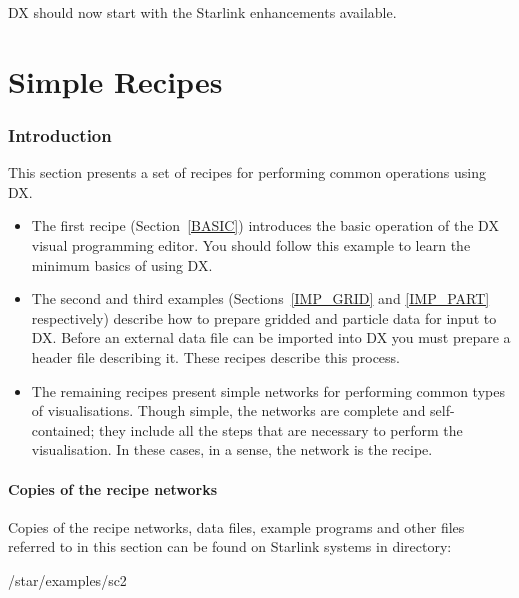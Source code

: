 \documentclass[twoside,11pt]{starlink}
\begin{document}
DX should now start with the Starlink enhancements available.


\cleardoublepage

\part{Simple Recipes}

\section{Introduction}

This section presents a set of recipes for performing common operations
using DX.

\begin{itemize}

  \item The first recipe (Section~\ref{BASIC}) introduces the basic
   operation of the DX visual programming editor. You should follow this
   example to learn the minimum basics of using DX.

  \item The second and third examples (Sections~\ref{IMP_GRID} and
   \ref{IMP_PART} respectively) describe how to prepare gridded and
   particle data for input to DX. Before an external data file can be
   imported into DX you must prepare a header file describing it. These
   recipes describe this process.

  \item The remaining recipes present simple networks for performing
   common types of visualisations. Though simple, the networks are
   complete and self-contained; they include all the steps that are
   necessary to perform the visualisation. In these cases, in a sense,
   the network is the recipe.

\end{itemize}

\subsection{Copies of the recipe networks}

Copies of the recipe networks, data files, example programs and other
files referred to in this section can be found on Starlink systems
in directory:

\begin{terminalv}
/star/examples/sc2
\end{terminalv}
\end{document}
